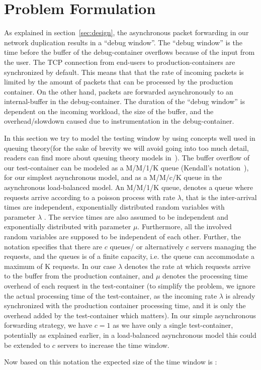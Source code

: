 \section{Problem Formulation}
\label{sec:model}

As explained in section~\ref{sec:design}, the asynchronous packet forwarding in our network duplication results in a ``debug window''. 
The ``debug window'' is the time before the buffer of the debug-container overflows because of the input from the user. 
The TCP connection from end-users to production-containers are synchronized by default.
This means that that the rate of incoming packets is limited by the amount of packets that can be processed by the production container. 
On the other hand, packets are forwarded asynchronously to an internal-buffer in the debug-container.
The duration of the ``debug window'' is dependent on the incoming workload, the size of the buffer, and the overhead/slowdown caused due to instrumentation in the debug-container.

In this section we try to model the testing window by using concepts well used in queuing theory(for the sake of brevity we will avoid going into too much detail, readers can find more about queuing theory models in~\cite{queueWiki}).
The buffer overflow of our test-container can be modeled as a M/M/1/K queue (Kendall's notation~\cite{kendall}), for our simplest asynchronous model, and as a M/M/c/K queue in the asynchronous load-balanced model.
An M/M/1/K queue, denotes a queue where requests arrive according to a poisson process with rate $\lambda$, that is the inter-arrival times are independent, exponentially distributed random variables with parameter $\lambda$ . 
The service times are also assumed to be independent and exponentially distributed with parameter $\mu$. Furthermore, all the involved random variables are supposed to be independent of each other. 
Further, the notation specifies that there are $c$ queues/ or alternatively $c$ servers managing the requests, and the queues is of a finite capacity, i.e. the queue can accommodate a maximum of K requests.
In our case $\lambda$ denotes the rate at which requests arrive to the buffer from the production container, and $\mu$ denotes the processing time overhead of each request in the test-container (to simplify the problem, we ignore the actual processing time of the test-container, as the incoming rate $\lambda$ is already synchronized with the production container processing time, and it is only the overhead added by the test-container which matters). 
In our simple asynchronous forwarding strategy, we have $c=1$ as we have only a single test-container, potentially as explained earlier, in a load-balanced asynchronous model this could be extended to $c$ servers to increase the time window.

Now based on this notation the expected size of the time window is :
